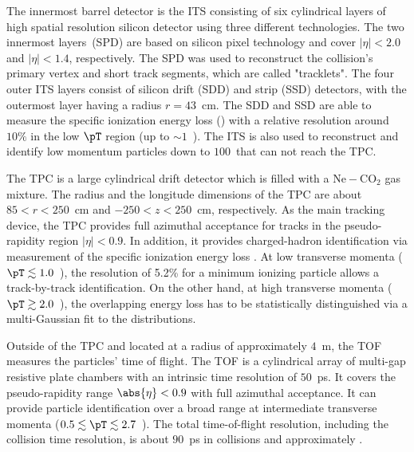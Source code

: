 \documentclass[ALICE,manyauthors]{cernphprep}
\begin{document}
The innermost barrel detector is the ITS consisting of six cylindrical layers of high spatial resolution silicon detector using three different technologies.
The two innermost layers~(SPD) are based on silicon pixel technology and cover $|\eta| < 2.0$ and $|\eta| < 1.4$, respectively.
The SPD was used to reconstruct the collision's primary vertex and short track segments, which are called "tracklets".
The four outer ITS layers consist of silicon drift (SDD) and strip (SSD) detectors, with the outermost layer having a radius $r = 43$~cm.
The SDD and SSD are able to measure the specific ionization energy loss (\dEdx) with a relative resolution around $10\%$ in the low $\pT$ region (up to $\sim 1$~\GeVc).
The ITS is also used to reconstruct and identify low momentum particles down to $100$~\MeVc that can not reach the TPC.

The TPC is a large cylindrical drift detector which is filled with a $\mathrm{Ne-CO_{2}}$ gas mixture.
The radius and the longitude dimensions of the TPC are about $85 < r < 250 $~cm and $-250 < z < 250 $~cm, respectively.
As the main tracking device, the TPC provides full azimuthal acceptance for tracks in the pseudo-rapidity region $|\eta| < 0.9$.
In addition, it provides charged-hadron identification via measurement of the specific ionization energy loss \dEdx.
At low transverse momenta ($\pT \lesssim 1.0$~\GeVc), the \dEdx resolution of 5.2\% for a minimum ionizing particle allows a track-by-track identification. On the other hand, at high transverse momenta ($\pT \gtrsim 2.0$~\GeVc), the overlapping energy loss has to be statistically distinguished via a multi-Gaussian fit to the \dEdx distributions.

Outside of the TPC and located at a radius of approximately $4$~m, the TOF measures the particles' time of flight.
The TOF is a cylindrical array of multi-gap resistive plate chambers with an intrinsic time resolution of $50$~ps.
It covers the pseudo-rapidity range $\abs{\eta} < 0.9$ with full azimuthal acceptance.
It can provide particle identification over a broad range at intermediate transverse momenta ($0.5 \lesssim \pT \lesssim 2.7$~\GeVc).
The total time-of-flight resolution, including the collision time resolution, is about $90$~ps in \pp collisions and approximately .
\end{document}
